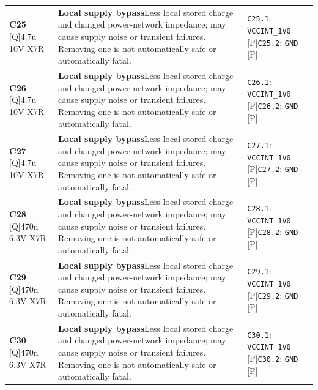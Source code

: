 \documentclass[11pt,a4paper]{article}
\begin{document}
\begin{longtable}{@{}P{27mm}P{77mm}P{62mm}@{}}
\textbf{C25} [Q]\newline 4.7u 10V X7R & \textbf{Local supply bypass}\newline Less local stored charge and changed power-network impedance; may cause supply noise or transient failures. Removing one is not automatically safe or automatically fatal. & \nolinkurl{C25.1}: \nolinkurl{VCCINT_1V0} [P]\newline \nolinkurl{C25.2}: \nolinkurl{GND} [P] \\
\textbf{C26} [Q]\newline 4.7u 10V X7R & \textbf{Local supply bypass}\newline Less local stored charge and changed power-network impedance; may cause supply noise or transient failures. Removing one is not automatically safe or automatically fatal. & \nolinkurl{C26.1}: \nolinkurl{VCCINT_1V0} [P]\newline \nolinkurl{C26.2}: \nolinkurl{GND} [P] \\
\textbf{C27} [Q]\newline 4.7u 10V X7R & \textbf{Local supply bypass}\newline Less local stored charge and changed power-network impedance; may cause supply noise or transient failures. Removing one is not automatically safe or automatically fatal. & \nolinkurl{C27.1}: \nolinkurl{VCCINT_1V0} [P]\newline \nolinkurl{C27.2}: \nolinkurl{GND} [P] \\
\textbf{C28} [Q]\newline 470n 6.3V X7R & \textbf{Local supply bypass}\newline Less local stored charge and changed power-network impedance; may cause supply noise or transient failures. Removing one is not automatically safe or automatically fatal. & \nolinkurl{C28.1}: \nolinkurl{VCCINT_1V0} [P]\newline \nolinkurl{C28.2}: \nolinkurl{GND} [P] \\
\textbf{C29} [Q]\newline 470n 6.3V X7R & \textbf{Local supply bypass}\newline Less local stored charge and changed power-network impedance; may cause supply noise or transient failures. Removing one is not automatically safe or automatically fatal. & \nolinkurl{C29.1}: \nolinkurl{VCCINT_1V0} [P]\newline \nolinkurl{C29.2}: \nolinkurl{GND} [P] \\
\textbf{C30} [Q]\newline 470n 6.3V X7R & \textbf{Local supply bypass}\newline Less local stored charge and changed power-network impedance; may cause supply noise or transient failures. Removing one is not automatically safe or automatically fatal. & \nolinkurl{C30.1}: \nolinkurl{VCCINT_1V0} [P]\newline \nolinkurl{C30.2}: \nolinkurl{GND} [P] \\

\end{longtable}
\end{document}
